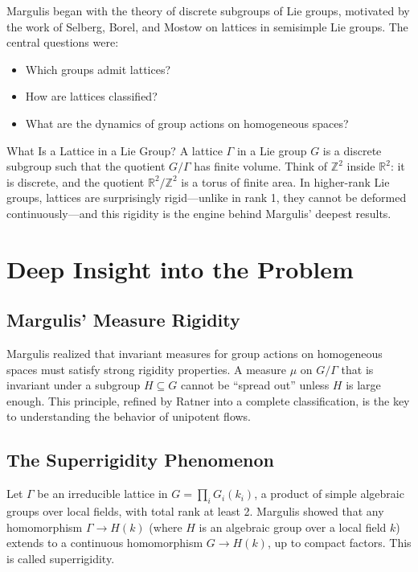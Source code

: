 Margulis began with the theory of discrete subgroups of Lie groups, motivated by the work of Selberg, Borel, and Mostow on lattices in semisimple Lie groups. The central questions were:
\begin{itemize}
\item Which groups admit lattices?
\item How are lattices classified?
\item What are the dynamics of group actions on homogeneous spaces?
\end{itemize}

\begin{primer}{What Is a Lattice in a Lie Group?}
A lattice $\Gamma$ in a Lie group $G$ is a discrete subgroup such that the quotient $G/\Gamma$ has finite volume. Think of $\mathbb{Z}^2$ inside $\mathbb{R}^2$: it is discrete, and the quotient $\mathbb{R}^2/\mathbb{Z}^2$ is a torus of finite area. In higher-rank Lie groups, lattices are surprisingly rigid---unlike in rank 1, they cannot be deformed continuously---and this rigidity is the engine behind Margulis' deepest results.
\end{primer}

\section{Deep Insight into the Problem}

\subsection{Margulis' Measure Rigidity}

Margulis realized that invariant measures for group actions on homogeneous spaces must satisfy strong rigidity properties. A measure $\mu$ on $G/\Gamma$ that is invariant under a subgroup $H \subseteq G$ cannot be ``spread out'' unless $H$ is large enough. This principle, refined by Ratner into a complete classification, is the key to understanding the behavior of unipotent flows.

\subsection{The Superrigidity Phenomenon}

Let $\Gamma$ be an irreducible lattice in $G = \prod_i G_i(k_i)$, a product of simple algebraic groups over local fields, with total rank at least 2. Margulis showed that any homomorphism $\Gamma \to H(k)$ (where $H$ is an algebraic group over a local field $k$) extends to a continuous homomorphism $G \to H(k)$, up to compact factors. This is called superrigidity.

